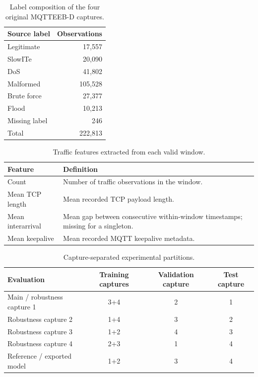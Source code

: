 \begin{table}[t]
\centering
\caption{Label composition of the four original MQTTEEB-D captures.}
\label{tab:data}
\begin{tabular}{lr}
\toprule
Source label & Observations \\
\midrule
Legitimate & 17,557 \\
SlowITe & 20,090 \\
DoS & 41,802 \\
Malformed & 105,528 \\
Brute force & 27,377 \\
Flood & 10,213 \\
Missing label & 246 \\
Total & 222,813 \\
\bottomrule
\end{tabular}
\end{table}

\begin{table}[t]
\centering
\caption{Traffic features extracted from each valid window.}
\label{tab:features}
\begin{tabularx}{\columnwidth}{lX}
\toprule
Feature & Definition \\
\midrule
Count & Number of traffic observations in the window. \\
Mean TCP length & Mean recorded TCP payload length. \\
Mean interarrival & Mean gap between consecutive within-window timestamps; missing for a singleton. \\
Mean keepalive & Mean recorded MQTT keepalive metadata. \\
\bottomrule
\end{tabularx}
\end{table}

\begin{table}[t]
\centering
\caption{Capture-separated experimental partitions.}
\label{tab:splits}
\begin{tabularx}{\textwidth}{Xccc}
\toprule
Evaluation & Training captures & Validation capture & Test capture \\
\midrule
Main / robustness capture 1 & 3+4 & 2 & 1 \\
Robustness capture 2 & 1+4 & 3 & 2 \\
Robustness capture 3 & 1+2 & 4 & 3 \\
Robustness capture 4 & 2+3 & 1 & 4 \\
Reference / exported model & 1+2 & 3 & 4 \\
\bottomrule
\end{tabularx}
\end{table}

